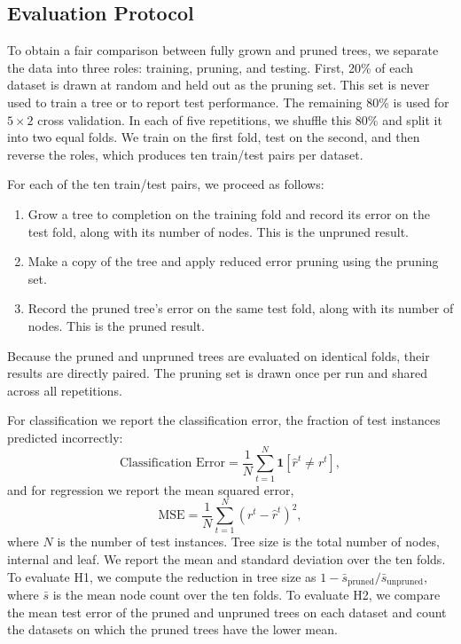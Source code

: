 \documentclass[twoside,11pt]{article}
\begin{document}
\subsection{Evaluation Protocol}
To obtain a fair comparison between fully grown and pruned trees, we separate the data into three roles: training, pruning, and testing. First, 20\% of each dataset is drawn at random and held out as the pruning set. This set is never used to train a tree or to report test performance. The remaining 80\% is used for $5 \times 2$ cross validation. In each of five repetitions, we shuffle this 80\% and split it into two equal folds. We train on the first fold, test on the second, and then reverse the roles, which produces ten train/test pairs per dataset.

For each of the ten train/test pairs, we proceed as follows:
\begin{enumerate}
    \item Grow a tree to completion on the training fold and record its error on the test fold, along with its number of nodes. This is the unpruned result.
    \item Make a copy of the tree and apply reduced error pruning using the pruning set.
    \item Record the pruned tree's error on the same test fold, along with its number of nodes. This is the pruned result.
\end{enumerate}
Because the pruned and unpruned trees are evaluated on identical folds, their results are directly paired. The pruning set is drawn once per run and shared across all repetitions.

For classification we report the classification error, the fraction of test instances predicted incorrectly:
\begin{equation}
    \text{Classification Error} = \frac{1}{N}\sum_{t=1}^{N} \mathbf{1}\left[\hat{r}^t \neq r^t\right],
\end{equation}
and for regression we report the mean squared error,
\begin{equation}
    \text{MSE} = \frac{1}{N}\sum_{t=1}^{N} \left(r^t - \hat{r}^t\right)^2,
\end{equation}
where $N$ is the number of test instances. Tree size is the total number of nodes, internal and leaf. We report the mean and standard deviation over the ten folds. To evaluate H1, we compute the reduction in tree size as $1 - \bar{s}_{\text{pruned}} / \bar{s}_{\text{unpruned}}$, where $\bar{s}$ is the mean node count over the ten folds. To evaluate H2, we compare the mean test error of the pruned and unpruned trees on each dataset and count the datasets on which the pruned trees have the lower mean.
\end{document}
